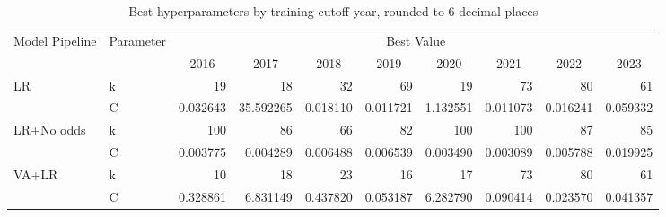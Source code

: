 \documentclass[12pt,twoside]{report}
\begin{document}
\tiny 
\begin{longtable}{llrrrrrrrr}
\caption{Best hyperparameters by training cutoff year, rounded to 6 decimal places}\\ 
\toprule
\multirow{2}{*}{Model Pipeline}   & \multirow{2}{*}{Parameter} & \multicolumn{8}{c}{Best Value}                                                                                                                                                                                         \\* 
\cmidrule[\heavyrulewidth]{3-10}
                                  &                            & \multicolumn{1}{c}{2016} & \multicolumn{1}{c}{2017} & \multicolumn{1}{c}{2018} & \multicolumn{1}{c}{2019} & \multicolumn{1}{c}{2020} & \multicolumn{1}{c}{2021} & \multicolumn{1}{c}{2022} & \multicolumn{1}{c}{2023}  \\* 
\toprule
\multirow{2}{*}{LR}               & k                          & 19                       & 18                       & 32                       & 69                       & 19                       & 73                       & 80                       & 61                        \\*
                                  & C                          & 0.032643                 & 35.592265                & 0.018110                 & 0.011721                 & 1.132551                 & 0.011073                 & 0.016241                 & 0.059332                  \\* 
\midrule
\multirow{2}{*}{LR+No odds}       & k                          & 100                      & 86                       & 66                       & 82                       & 100                      & 100                      & 87                       & 85                        \\*
                                  & C                          & 0.003775                 & 0.004289                 & 0.006488                 & 0.006539                 & 0.003490                 & 0.003089                 & 0.005788                 & 0.019925                  \\* 
\midrule
\multirow{2}{*}{VA+LR}            & k                          & 10                       & 18                       & 23                       & 16                       & 17                       & 73                       & 80                       & 61                        \\*
                                  & C                          & 0.328861                 & 6.831149                 & 0.437820                 & 0.053187                 & 6.282790                 & 0.090414                 & 0.023570                 & 0.041357                  \\* 

\end{longtable}
\end{document}

